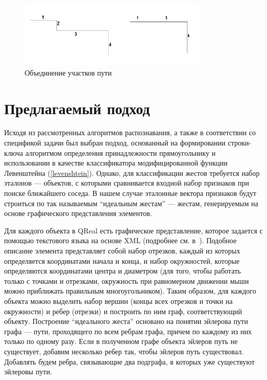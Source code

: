 \documentclass[a5paper]{article}
\begin{document}
\begin{figure} [ht]
  \begin{center}
    \includegraphics[width=0.8\textwidth, bb=0 0 500 200]{04-qt.png}
    \caption{Объединение участков пути}
    \label{qt}
  \end{center}
\end{figure}

\section{Предлагаемый подход}
Исходя из рассмотренных алгоритмов распознавания, а также в соответствии со спецификой задачи был выбран подход, основанный на формировании строки-ключа алгоритмом определения принадлежности прямоугольнику и использовании в качестве классификатора модифицированной функции Левенштейна (\ref{levenshtein}). Однако, для классификации жестов требуется набор эталонов --- объектов, с которыми сравнивается входной набор признаков при поиске ближайшего соседа. В нашем случае эталонные вектора признаков будут строиться по так называемым ``идеальным жестам'' --- жестам, генерируемым на основе графического представления элементов. 

Для каждого объекта в QReal есть графическое представление, которое задается с помощью текстового языка на основе XML (подробнее см. в~\cite{qreal}). Подобное описание элемента представляет собой набор отрезков, каждый из которых определяется координатами начала и конца, и набор окружностей, которые определяются координатами центра и диаметром (для того, чтобы работать только с точками и отрезками, окружность при равномерном движении мыши можно приближать правильным многоугольником). Таким образом, для каждого объекта можно выделить набор вершин (концы всех отрезков и точки на окружности) и ребер (отрезки) и построить по ним граф, соответствующий объекту. Построение ``идеального жеста'' основано на понятии эйлерова пути графа --- пути, проходящего по всем ребрам графа, причем по каждому из них только по одному разу. Если в полученном графе объекта эйлеров путь не существует, добавим несколько ребер так, чтобы эйлеров путь существовал. Добавлять будем ребра, связывающие два подграфа, в которых уже существуют эйлеровы пути.
\end{document}
